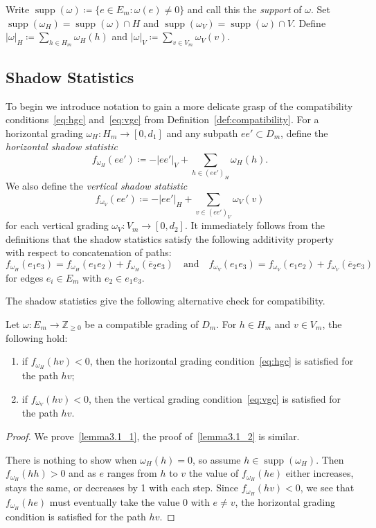 \documentclass[ALCO,ThmDefs,Unicode,epreuves]{cedram}
\newcommand{\ZZ}{\mathbb{Z}}
\DeclareMathOperator{\supp}{supp}
\begin{document}
Write $\supp(\omega)\coloneqq \{e\in E_m:\omega(e)\ne0\}$ and call this the \emph{support} of $\omega$.
Set $\supp(\omega_H)=\supp(\omega)\cap H$ and $\supp(\omega_V)=\supp(\omega)\cap V$.
Define $|\omega|_H\coloneqq \sum\limits_{h\in H_m} \omega_H(h)$ and $|\omega|_V\coloneqq \sum\limits_{v\in V_m} \omega_V(v)$. 

\subsection{Shadow Statistics}
\label{sec:shadows}
To begin we introduce notation to gain a more delicate grasp of the compatibility conditions~\eqref{eq:hgc} and~\eqref{eq:vgc} from Definition~\ref{def:compatibility}.
For a horizontal grading $\omega_H:H_m\to[0,d_1]$ and any subpath $ee'\subset D_m$, define the \emph{horizontal shadow statistic}
\[f_{\omega_H}(ee')\coloneqq -|ee'|_V+\sum\limits_{h\in(ee')_H}\omega_H(h).\]
We also define the \emph{vertical shadow statistic}
\[f_{\omega_V}(ee')\coloneqq -|ee'|_H+\sum\limits_{v\in(ee')_V}\omega_V(v)\]
for each vertical grading $\omega_V:V_m\to[0,d_2]$. 
It immediately follows from the definitions that the shadow statistics satisfy the following additivity property with respect to concatenation of paths:
\begin{equation}
 \label{eq:shadow statistic concatenation}
 f_{\omega_H}(e_1e_3)=f_{\omega_H}(e_1e_2)+f_{\omega_H}(\overline{e}_2e_3)\quad\text{and}\quad f_{\omega_V}(e_1e_3)=f_{\omega_V}(e_1e_2)+f_{\omega_V}(\overline{e}_2e_3)
\end{equation}
for edges $e_i\in E_m$ with $e_2\in e_1e_3$.

The shadow statistics give the following alternative check for compatibility.
\begin{lemma}
 \label{le:compatibility inequality}
 Let $\omega:E_m\to\ZZ_{\ge0}$ be a compatible grading of $D_m$. For $h\in H_m$ and $v\in V_m$, the following hold:
 \begin{enumerate}[label=(\alph*)]
 \item\label{lemma3.1_1} if $f_{\omega_H}(hv)<0$, then the horizontal grading condition~\eqref{eq:hgc} is satisfied for the path $hv$;
 \item\label{lemma3.1_2} if $f_{\omega_V}(hv)<0$, then the vertical grading condition~\eqref{eq:vgc} is satisfied for the path $hv$.
 \end{enumerate}
\end{lemma}
\begin{proof}
 We prove~\ref{lemma3.1_1}, the proof of~\ref{lemma3.1_2} is similar.
 
 There is nothing to show when $\omega_H(h)=0$, so assume $h\in\supp(\omega_H)$.
 Then $f_{\omega_H}(hh)>0$ and as $e$ ranges from $h$ to $v$ the value of $f_{\omega_H}(he)$ either increases, stays the same, or decreases by 1 with each step.
 Since $f_{\omega_H}(hv)<0$, we see that $f_{\omega_H}(he)$ must eventually take the value 0 with $e\ne v$, \ie the horizontal grading condition is satisfied for the path $hv$.
\end{proof}
\end{document}
